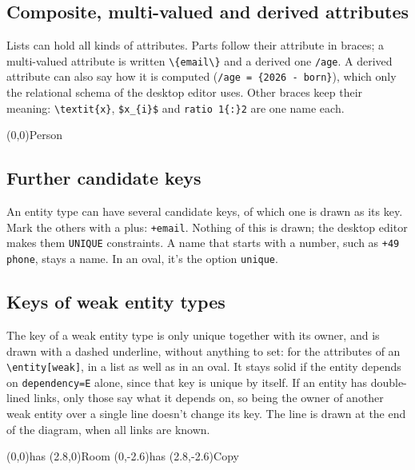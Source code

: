 \documentclass[10pt,a4paper]{article}
\newcommand\cs[1]{\texttt{\textbackslash#1}}
\begin{document}
\subsection{Composite, multi-valued and derived attributes}

Lists can hold all kinds of attributes. Parts follow their attribute in braces;
a multi-valued attribute is written \verb|\{email\}| and a derived one \verb|/age|. A
derived attribute can also say how it is computed (\verb|/age = {2026 - born}|), which only
the relational schema of the desktop editor uses. Other braces keep their meaning:
\verb|\textit{x}|, \verb|$x_{i}$| and \verb|ratio 1{:}2| are one name each.

\begin{example}
\begin{erdiagram}
  (0,0){Person}
\end{erdiagram}
\end{example}

\subsection{Further candidate keys}

An entity type can have several candidate keys, of which one is drawn as its key.
Mark the others with a plus: \verb|+email|. Nothing of this is drawn; the desktop
editor makes them \texttt{UNIQUE} constraints. A name that starts with a number, such as \verb|+49 phone|,
stays a name. In an oval, it's the option \texttt{unique}.

\subsection{Keys of weak entity types}

The key of a weak entity type is only unique together with its owner, and is
drawn with a dashed underline, without anything to set: for the attributes of an
\cs{entity}\texttt{[weak]}, in a list as well as in an oval. It stays solid if the entity
depends on \texttt{dependency=E} alone, since that key is unique by itself. If an entity has
double-lined links, only those say what it depends on, so being the owner of another weak entity
over a single line doesn't change its key. The line is drawn at the end of the diagram, when all
links are known.

\begin{example}
\begin{erdiagram}
  (0,0){has}
  (2.8,0){Room}
  (0,-2.6){has}
  (2.8,-2.6){Copy}
\end{erdiagram}
\end{example}
\end{document}
